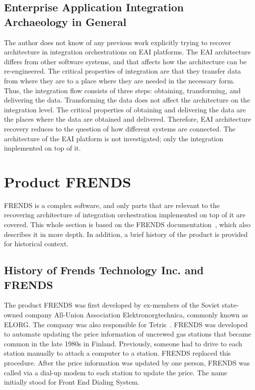 \documentclass[english, 12pt, a4paper, sci, utf8, a-2b, online, obeyspaces]{aaltothesis}
\begin{document}
\subsection{Enterprise Application Integration  Archaeology in General}
\label{eai_archaeology_in_general}
The author does not know of any previous work explicitly trying to recover architecture in integration orchestrations on EAI platforms. The EAI architecture differs from other software systems, and that affects how the architecture can be re-engineered. The critical properties of integration are that they transfer data from where they are to a place where they are needed in the necessary form. Thus, the integration flow consists of three steps: obtaining, transforming, and delivering the data. Transforming the data does not affect the architecture on the integration level. The critical properties of obtaining and delivering the data are the places where the data are obtained and delivered. Therefore, EAI architecture recovery reduces to the question of how different systems are connected. The architecture of the EAI platform is not investigated; only the integration implemented on top of it.

\clearpage
\section{Product FRENDS}
\label{sec:product_frends}
FRENDS is a complex software, and only parts that are relevant to the recovering architecture of integration orchestration implemented on top of it are covered. This whole section is based on the FRENDS documentation~\cite{hiq2018integration}, which also describes it in more depth. In addition, a brief history of the product is provided for historical context.

\subsection{History of Frends Technology Inc. and FRENDS}
The product FRENDS was first developed by ex-members of the Soviet state-owned company All-Union Association Elektronorgtechnica, commonly known as ELORG. The company was also responsible for Tetris~\cite{weisberger2016tetris}. FRENDS was developed to automate updating the price information of uncrewed gas stations that became common in the late 1980s in Finland. Previously, someone had to drive to each station manually to attach a computer to a station. FRENDS replaced this procedure. After the price information was updated by one person, FRENDS was called via a dial-up modem to each station to update the price. The name initially stood for Front End Dialing System.
\end{document}
